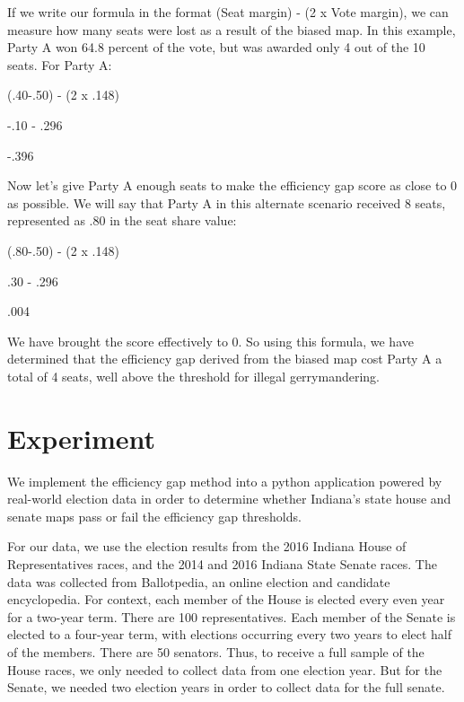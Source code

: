 \documentclass[sigconf]{acmart}
\begin{document}
If we write our formula in the format (Seat margin) - (2 x Vote margin), we can measure how many seats were lost as a result of the biased map. In this example, Party A won 64.8 percent of the vote, but was awarded only 4 out of the 10 seats. For Party A:

\begin{center}
    (.40-.50) - (2 x .148)
    
    -.10 - .296
    
    -.396
\end{center}

Now let's give Party A enough seats to make the efficiency gap score as close to 0 as possible. We will say that Party A in this alternate scenario received 8 seats, represented as .80 in the seat share value:

\begin{center}
    (.80-.50) - (2 x .148)
    
    .30 - .296
    
    .004
\end{center}

We have brought the score effectively to 0. So using this formula, we have determined that the efficiency gap derived from the biased map cost Party A a total of 4 seats, well above the threshold for illegal gerrymandering.

\section{Experiment}

We implement the efficiency gap method into a python application powered by real-world election data in order to determine whether Indiana's state house and senate maps pass or fail the efficiency gap thresholds. 

For our data, we use the election results from the 2016 Indiana House of Representatives races\cite{houseresults}, and the 2014 and 2016 Indiana State Senate races\cite{senateresults2014}\cite{senateresults2016}. The data was collected from Ballotpedia, an online election and candidate encyclopedia. For context, each member of the House is elected every even year for a two-year term. There are 100 representatives. Each member of the Senate is elected to a four-year term, with elections occurring every two years to elect half of the members. There are 50 senators. Thus, to receive a full sample of the House races, we only needed to collect data from one election year. But for the Senate, we needed two election years in order to collect data for the full senate.
\end{document}
